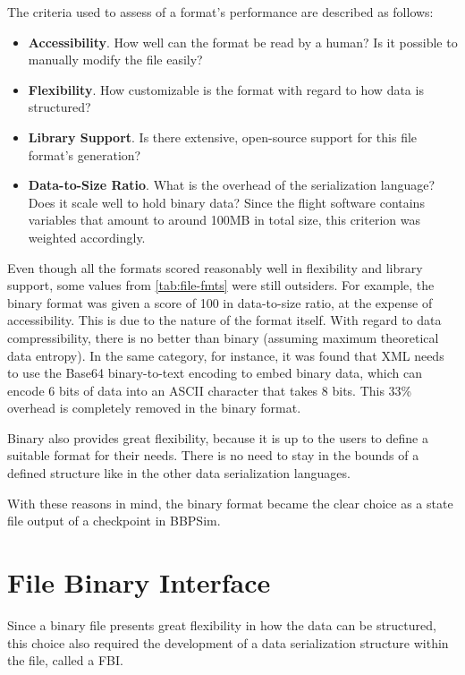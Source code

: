 {The criteria used to assess of a format's performance are described as follows:
\begin{itemize}
	\item {\bfseries Accessibility}. How well can the format be read by a human? Is it possible to manually modify the file easily? 
	\item {\bfseries Flexibility}. How customizable is the format with regard to how data is structured?
	\item {\bfseries Library Support}. Is there extensive, open-source support for this file format's generation?
	\item {\bfseries Data-to-Size Ratio}. What is the overhead of the serialization language? Does it scale well to hold binary data? Since the flight software contains variables that amount to around 100MB in total size, this criterion was weighted accordingly. 
\end{itemize}

Even though all the formats scored reasonably well in flexibility and library support, some values from \autoref{tab:file-fmts} were still outsiders. For example, the binary format was given a score of 100 in data-to-size ratio, at the expense of accessibility. This is due to the nature of the format itself. With regard to data compressibility, there is no better than binary (assuming maximum theoretical data entropy\cite{art:shannon}). In the same category, for instance, it was found that XML needs to use the Base64 binary-to-text encoding to embed binary data, which can encode 6 bits of data into an \gls{ASCII} character that takes 8 bits\cite{art:base64}. This 33\% overhead is completely removed in the binary format. 

Binary also provides great flexibility, because it is up to the users to define a suitable format for their needs. There is no need to stay in the bounds of a defined structure like in the other data serialization languages.

With these reasons in mind, the binary format became the clear choice as a state file output of a checkpoint in BBPSim.

\section{File Binary Interface}
Since a binary file presents great flexibility in how the data can be structured, this choice also required the development of a data serialization structure within the file, called a \gls{FBI}.

}
